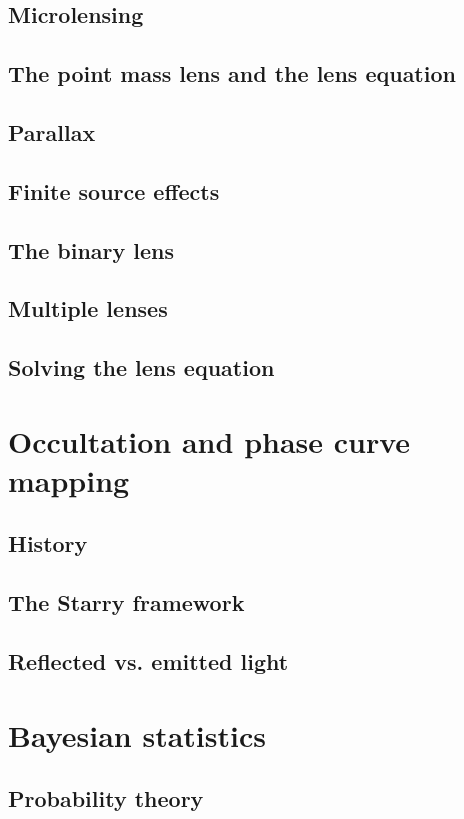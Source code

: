 \documentclass[11pt]{report}
\begin{document}
\subsection{Microlensing}
\subsection{The point mass lens and the lens equation}
\subsection{Parallax}
\subsection{Finite source effects}
\subsection{The binary lens}
\subsection{Multiple lenses}
\subsection{Solving the lens equation}

\section{Occultation and phase curve mapping}
\label{sec:occultations}
\subsection{History}
\subsection{The Starry framework}
\subsection{Reflected vs. emitted light}

\section{Bayesian statistics}
\label{sec:bayes}
\subsection{Probability theory}
\end{document}
